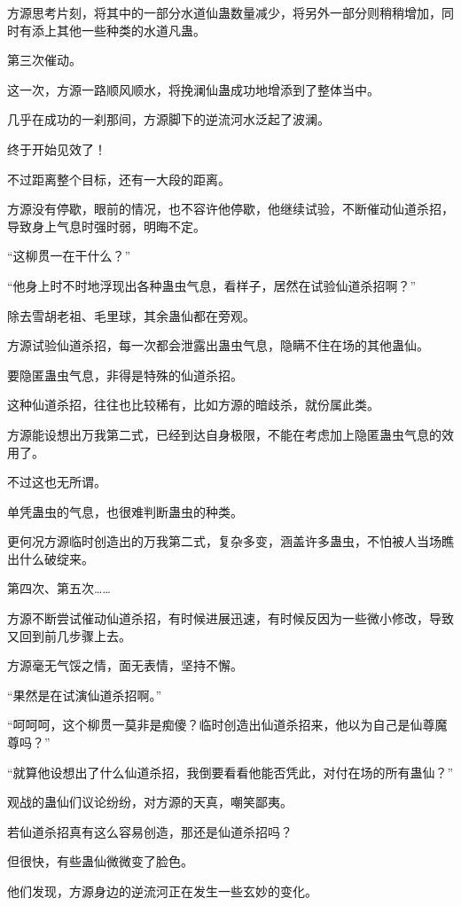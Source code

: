 \begin{this_body}
方源思考片刻，将其中的一部分水道仙蛊数量减少，将另外一部分则稍稍增加，同时有添上其他一些种类的水道凡蛊。

第三次催动。

这一次，方源一路顺风顺水，将挽澜仙蛊成功地增添到了整体当中。

几乎在成功的一刹那间，方源脚下的逆流河水泛起了波澜。

终于开始见效了！

不过距离整个目标，还有一大段的距离。

方源没有停歇，眼前的情况，也不容许他停歇，他继续试验，不断催动仙道杀招，导致身上气息时强时弱，明晦不定。

“这柳贯一在干什么？”

“他身上时不时地浮现出各种蛊虫气息，看样子，居然在试验仙道杀招啊？”

除去雪胡老祖、毛里球，其余蛊仙都在旁观。

方源试验仙道杀招，每一次都会泄露出蛊虫气息，隐瞒不住在场的其他蛊仙。

要隐匿蛊虫气息，非得是特殊的仙道杀招。

这种仙道杀招，往往也比较稀有，比如方源的暗歧杀，就份属此类。

方源能设想出万我第二式，已经到达自身极限，不能在考虑加上隐匿蛊虫气息的效用了。

不过这也无所谓。

单凭蛊虫的气息，也很难判断蛊虫的种类。

更何况方源临时创造出的万我第二式，复杂多变，涵盖许多蛊虫，不怕被人当场瞧出什么破绽来。

第四次、第五次……

方源不断尝试催动仙道杀招，有时候进展迅速，有时候反因为一些微小修改，导致又回到前几步骤上去。

方源毫无气馁之情，面无表情，坚持不懈。

“果然是在试演仙道杀招啊。”

“呵呵呵，这个柳贯一莫非是痴傻？临时创造出仙道杀招来，他以为自己是仙尊魔尊吗？”

“就算他设想出了什么仙道杀招，我倒要看看他能否凭此，对付在场的所有蛊仙？”

观战的蛊仙们议论纷纷，对方源的天真，嘲笑鄙夷。

若仙道杀招真有这么容易创造，那还是仙道杀招吗？

但很快，有些蛊仙微微变了脸色。

他们发现，方源身边的逆流河正在发生一些玄妙的变化。


\end{this_body}

